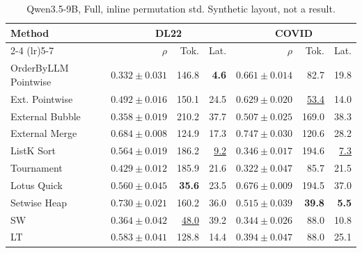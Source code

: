 \begin{table}[t]
\centering\footnotesize\setlength{\tabcolsep}{3.2pt}\renewcommand{\arraystretch}{1.12}
\caption{Qwen3.5-9B, Full, inline permutation std. Synthetic layout, not a result.}
\begin{tabular}{@{}lrrrrrr@{}}
\toprule
Method & \multicolumn{3}{c}{DL22} & \multicolumn{3}{c}{COVID} \\
\cmidrule(lr){2-4} \cmidrule(lr){5-7}
 & $\rho$ & Tok. & Lat. & $\rho$ & Tok. & Lat. \\
\midrule
OrderByLLM Pointwise & $0.332\pm0.031$ & 146.8 & \textbf{4.6} & $0.661\pm0.014$ & 82.7 & 19.8 \\
Ext. Pointwise & $0.492\pm0.016$ & 150.1 & 24.5 & $0.629\pm0.020$ & \underline{53.4} & 14.0 \\
External Bubble & $0.358\pm0.019$ & 210.2 & 37.7 & $0.507\pm0.025$ & 169.0 & 38.3 \\
External Merge & \underline{$0.684\pm0.008$} & 124.9 & 17.3 & \textbf{$0.747\pm0.030$} & 120.6 & 28.2 \\
ListK Sort & $0.564\pm0.019$ & 186.2 & \underline{9.2} & $0.346\pm0.017$ & 194.6 & \underline{7.3} \\
Tournament & $0.429\pm0.012$ & 185.9 & 21.6 & $0.322\pm0.047$ & 85.7 & 21.5 \\
Lotus Quick & $0.560\pm0.045$ & \textbf{35.6} & 23.5 & \underline{$0.676\pm0.009$} & 194.5 & 37.0 \\
Setwise Heap & \textbf{$0.730\pm0.021$} & 160.2 & 36.0 & $0.515\pm0.039$ & \textbf{39.8} & \textbf{5.5} \\
SW & $0.364\pm0.042$ & \underline{48.0} & 39.2 & $0.344\pm0.026$ & 88.0 & 10.8 \\
LT & $0.583\pm0.041$ & 128.8 & 14.4 & $0.394\pm0.047$ & 88.0 & 25.1 \\
\bottomrule
\end{tabular}
\end{table}

